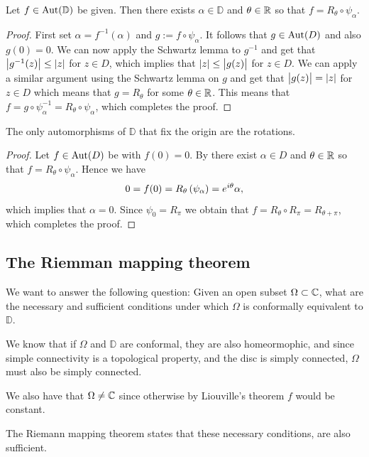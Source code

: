 \documentclass[11pt,a4paper]{article}
\begin{document}
\begin{proposition}
  \label{prop:classification-of-automorphisms-of-the-disc}
  Let $f \in \operatorname{Aut}(\mathbb D)$ be given.
  Then there exists $\alpha \in \mathbb D$ and $\theta \in \mathbb{R}$ so that
  $f = R_{\theta} \circ \psi_{\alpha}$.
\end{proposition}
\begin{proof}
  First set $\alpha =  f^{-1}(\alpha)$ and $g := f \circ \psi_{\alpha}$.
  It follows that $g \in \operatorname{Aut}(D)$ and also $g(0) = 0$.
  We can now apply the Schwartz lemma to $g^{-1}$ and get that
  $\left\lvert g^{-1}(z)\right\rvert \le \left\lvert z\right\rvert$ for $z \in D$,
  which implies that $\left\lvert z\right\rvert \le \left\lvert g(z)\right\rvert$ for $z \in D$.
  We can apply a similar argument using the Schwartz lemma on $g$ and get
  that $\left\lvert g(z)\right\rvert = \left\lvert z\right\rvert$ for $z \in D$ which means that $g = R_{\theta}$
  for some $\theta \in \mathbb{R}$.
  This means that
  $f = g \circ \psi_{\alpha}^{-1} = R_{\theta} \circ \psi_{\alpha}$,
  which completes the proof.
\end{proof}

\begin{corollary}
  The only automorphisms of $\mathbb D$ that fix the origin are the rotations.
\end{corollary}
\begin{proof}
  Let $f \in \operatorname{Aut}(D)$ be with $f(0) = 0$.
  By  there exist
  $\alpha \in D$ and $\theta \in \mathbb{R}$ so that
  $f = R_{\theta} \circ \psi_{\alpha}$.
  Hence we have
  \[
    0 = f(0) = R_{\theta}\del{\psi_{\alpha}} = e^{i \theta} \alpha,
  \]
  which implies that $\alpha = 0$.
  Since $\psi_{0} = R_{\pi}$ we obtain that
  $f = R_{\theta} \circ R_{\pi} = R_{\theta + \pi}$,
  which completes the proof.
\end{proof}

\subsection{The Riemman mapping theorem}
\begin{remark}
We want to answer the following question:
Given an open subset $\Omega \subset \mathbb{C}$,
what are the necessary and sufficient conditions under which $\Omega$ is
conformally equivalent to $\mathbb D$.

We know that if $\Omega$ and $\mathbb D$ are conformal, they are also
homeormophic, and since simple connectivity is a topological property,
and the disc is simply connected, $\Omega$ must also be simply connected.

We also have that $\Omega \neq \mathbb{C}$ since otherwise by Liouville's theorem
$f$ would be constant.

The Riemann mapping theorem states that these necessary conditions, are also
sufficient.
\end{remark}
\end{document}
